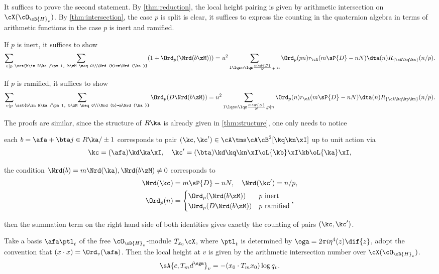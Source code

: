 \documentclass[a4paper, twoside]{article}
\begin{document}
\begin{prf}
	It suffices to prove the second statement. By \cref{thm:reduction}, the local height pairing is given by arithmetic intersection on $\cX(\cO_{\oB{H}_{v}})$. By \cref{thm:intersection}, the case $p$ is split is clear, it suffices to express the counting in the quaternion algebra in terms of arithmetic functions in the case $p$ is inert and ramified.

	If $p$ is inert, it suffices to show
	\[
		\sum_{v\mid p}\sum_{\sst{b\in R\ka/\pm1, b\zM\neq0\\\Nrd(b)=m\Nrd(\ka)}}(1+\Ord_{p}(\Nrd(b\zM)))=u^{2}\sum_{1\lqs n\lqs \frac{m\sP{D}}{N}, p\mid n}\Ord_{p}(pn)r_{\cA}(m\sP{D}-nN)\dta(n)R_{\{\cA\kq\kn\}}(n/p).
	\]

	If $p$ is ramified, it suffices to show
	\[
		\sum_{v\mid p}\sum_{\sst{b\in R\ka/\pm1, b\zM\neq0\\\Nrd(b)=m\Nrd(\ka)}}\Ord_{p}(D\Nrd(b\zM))=u^{2}\sum_{1\lqs n\lqs \frac{m\sP{D}}{N}, p\mid n}\Ord_{p}(n)r_{\cA}(m\sP{D}-nN)\dta(n)R_{\{\cA\kq\kp\kn\}}(n/p).
	\]

	The proofs are similar, since the structure of $R\ka$ is already given in \cref{thm:structure}, one only needs to notice
	\begin{itm}
		\item each $b=\afa+\bta j\in R\ka/\pm1$ corresponds to pair $(\kc,\kc')\in\cA\tms\cA\cB^{2}[\kq\kn\xI]$ up to unit action via
		\[
			\kc=(\afa)\kd\ka\xI,\quad \kc'=(\bta)\kd\kq\kn\xI\oL{\kb}\xI\kb\oL{\ka}\xI,
		\]
		\item the condition $\Nrd(b)=m\Nrd(\ka), \Nrd(b\zM)\neq0$ corresponds to
		\begin{align*}
			\Nrd(\kc)&=m\sP{D}-nN,\quad \Nrd(\kc')=n/p, \\
			\Ord_{p}(n)&=\begin{cases}
						  \Ord_{p}(\Nrd(b\zM)) & \text{$p$ inert} \\
						  \Ord_{p}(D\Nrd(b\zM)) & \text{$p$ ramified} \\
						\end{cases},
		\end{align*}
	\end{itm}
	then the summation term on the right hand side of both identities gives exactly the counting of pairs $(\kc,\kc')$.
\end{prf}

\begin{thm}\label{thm:reduction}
	Take a basis $\afa\ptl_{t}$ of the free $\cO_{\oB{H}_{v}}$-module $T_{x_{0}}\cX$, where $\ptl_{t}$ is determined by $\oga=2\pi i\eta^{4}(z)\dif{z}$, adopt the convention that $(x\cdot x)=\Ord_{v}(\afa)$. Then the local height at $v$ is given by the arithmetic intersection number over $\cX(\cO_{\oB{H}_{v}})$.
	\[
		\sA{c,T_{m}d^{\sgm}}_{v}=-(x_{0}\cdot T_{m}x_{0})\log{q_{v}}.
	\]

\end{thm}
\end{document}
